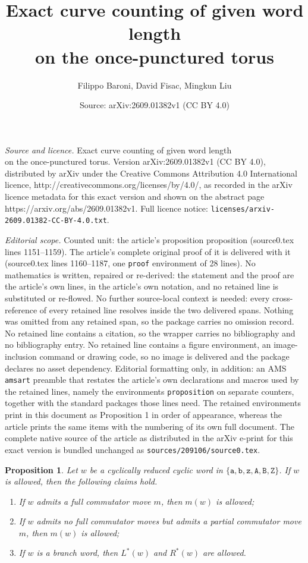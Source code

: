 \documentclass[10pt,a4paper]{amsart}
\title{Exact curve counting of given word length \\ on the once-punctured torus}
\author{Filippo Baroni, David Fisac, Mingkun Liu}
\date{Source: arXiv:2609.01382v1 (CC BY 4.0)}
\newtheorem{proposition}{Proposition}
\begin{document}
\maketitle

\noindent\emph{Source and licence.} Exact curve counting of given word length \\ on the once-punctured torus. Version arXiv:2609.01382v1 (CC BY 4.0), distributed by arXiv under the Creative Commons Attribution 4.0 International licence, http://creativecommons.org/licenses/by/4.0/, as recorded in the arXiv licence metadata for this exact version and shown on the abstract page https://arxiv.org/abs/2609.01382v1. Full licence notice: \texttt{licenses/arxiv-2609.01382-CC-BY-4.0.txt}.\par\smallskip

\noindent\textit{Editorial scope.} Counted unit: the article's proposition proposition (source0.tex lines 1151--1159). The article's complete original proof of it is delivered with it (source0.tex lines 1160--1187, one \texttt{proof} environment of 28 lines). No mathematics is written, repaired or re-derived: the statement and the proof are the article's own lines, in the article's own notation, and no retained line is substituted or re-flowed.  No further source-local context is needed: every cross-reference of every retained line resolves inside the two delivered spans.  Nothing was omitted from any retained span, so the package carries no omission record.  No retained line contains a citation, so the wrapper carries no bibliography and no bibliography entry.  No retained line contains a figure environment, an image-inclusion command or drawing code, so no image is delivered and the package declares no asset dependency.  Editorial formatting only, in addition: an AMS \texttt{amsart} preamble that restates the article's own declarations and macros used by the retained lines, namely the environments \texttt{proposition} on separate counters, together with the standard packages those lines need.  The retained environments print in this document as Proposition 1 in order of appearance, whereas the article prints the same items with the numbering of its own full document.  The complete native source of the article as distributed in the arXiv e-print for this exact version is bundled unchanged as \texttt{sources/209106/source0.tex}.
	\begin{proposition}
		Let $w$ be a cyclically reduced cyclic word in $\{\mathtt{a},\mathtt{b},\mathtt{z},\mathtt{A},\mathtt{B},\mathtt{Z}\}$.
		If $w$ is allowed, then the following claims hold.
		\begin{enumerate}
			\item If $w$ admits a full commutator move $m$, then $m(w)$ is allowed;
			\item If $w$ admits no full commutator moves but admits a partial commutator move $m$, then $m(w)$ is allowed;
			\item If $w$ is a branch word, then $L^*(w)$ and $R^*(w)$ are allowed.
		\end{enumerate}
	\end{proposition}
\end{document}
